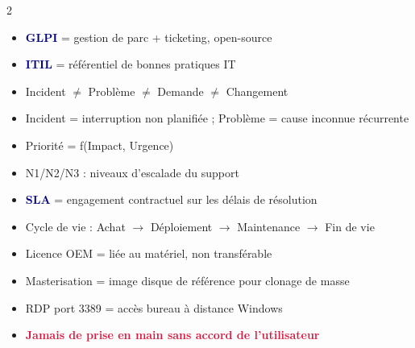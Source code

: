 \documentclass[a4paper,10pt]{article}
\newcommand{\key}[1]{\textbf{\textcolor{navy}{#1}}}
\newcommand{\warn}[1]{\textbf{\textcolor{crimson}{#1}}}
\begin{document}
\vspace{4pt}
\begin{tcolorbox}[basebox, colframe=green, title=Points clés à retenir pour l'examen]
\begin{multicols}{2}
\begin{itemize}
  \item \key{GLPI} = gestion de parc + ticketing, open-source
  \item \key{ITIL} = référentiel de bonnes pratiques IT
  \item Incident $\neq$ Problème $\neq$ Demande $\neq$ Changement
  \item Incident = interruption non planifiée ; Problème = cause inconnue récurrente
  \item Priorité = f(Impact, Urgence)
  \item N1/N2/N3 : niveaux d'escalade du support
  \item \key{SLA} = engagement contractuel sur les délais de résolution
  \item Cycle de vie : Achat $\to$ Déploiement $\to$ Maintenance $\to$ Fin de vie
  \item Licence OEM = liée au matériel, non transférable
  \item Masterisation = image disque de référence pour clonage de masse
  \item RDP port 3389 = accès bureau à distance Windows
  \item \warn{Jamais de prise en main sans accord de l'utilisateur}
\end{itemize}
\end{multicols}
\end{tcolorbox}
\end{document}
